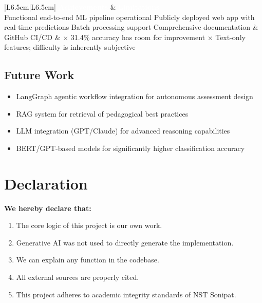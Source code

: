 \documentclass[12pt,a4paper]{article}
\begin{document}
\begin{table}[H]
\centering
\begin{tabular}{|L{6.5cm}|L{6.5cm}|}
\hline
{}
\textcolor{white}{\textbf{Achievements}} &
\textcolor{white}{\textbf{Limitations}} \\
\hline
\textcolor{successgreen}{\checkmark} Functional end-to-end ML pipeline operational \newline
\textcolor{successgreen}{\checkmark} Publicly deployed web app with real-time predictions \newline
\textcolor{successgreen}{\checkmark} Batch processing support \newline
\textcolor{successgreen}{\checkmark} Comprehensive documentation \& GitHub CI/CD
&
\textcolor{warningred}{$\times$} 31.4\% accuracy has room for improvement \newline
\textcolor{warningred}{$\times$} Text-only features; difficulty is inherently subjective \\
\hline
\end{tabular}
\caption{Project Achievements and Limitations}
\end{table}

\subsection{Future Work}

\begin{itemize}[leftmargin=1.5em, itemsep=4pt]
  \item LangGraph agentic workflow integration for autonomous assessment design
  \item RAG system for retrieval of pedagogical best practices
  \item LLM integration (GPT/Claude) for advanced reasoning capabilities
  \item BERT/GPT-based models for significantly higher classification accuracy
\end{itemize}

\newpage
\section*{Declaration}

\begin{achievebox}
\textbf{We hereby declare that:}
\begin{enumerate}[leftmargin=1.5em, itemsep=4pt]
  \item The core logic of this project is our own work.
  \item Generative AI was not used to directly generate the implementation.
  \item We can explain any function in the codebase.
  \item All external sources are properly cited.
  \item This project adheres to academic integrity standards of NST Sonipat.
\end{enumerate}
\end{achievebox}
\end{document}

